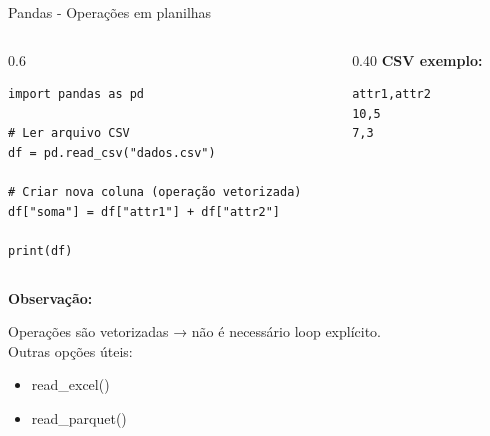 \documentclass{beamer}
\begin{document}
\begin{frame}[fragile]{Pandas - Operações em planilhas}
    \begin{columns}[t]
        \begin{column}[t]{0.6\textwidth}
    
            \begin{verbatim}
import pandas as pd

# Ler arquivo CSV
df = pd.read_csv("dados.csv")

# Criar nova coluna (operação vetorizada)
df["soma"] = df["attr1"] + df["attr2"]

print(df)
            \end{verbatim}
        \end{column}
        \begin{column}[t]{0.40\textwidth}
            \textbf{CSV exemplo:}
        
            \begin{verbatim}
attr1,attr2
10,5
7,3
            \end{verbatim}
        \end{column}
    \end{columns}
    \textbf{Observação:}
    
    Operações são vetorizadas → não é necessário loop explícito.\\
    Outras opções úteis: 
    \begin{itemize}
        \item read\_excel() 
        \item read\_parquet()
    \end{itemize}
    
\end{frame}
\end{document}
